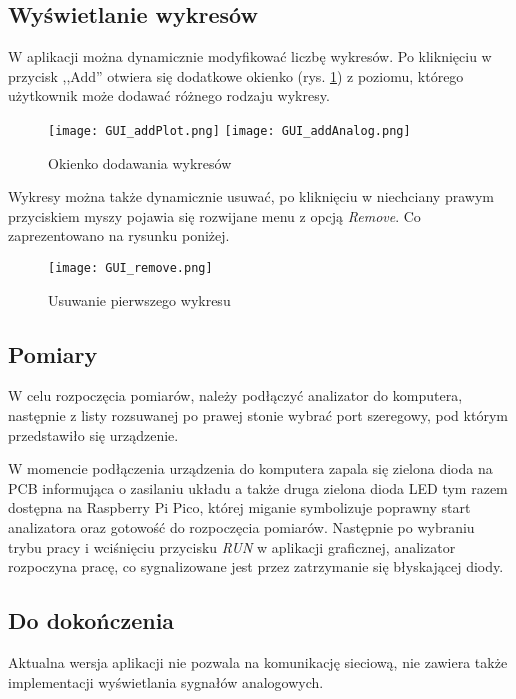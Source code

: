     \subsection{Wyświetlanie wykresów}
        W aplikacji można dynamicznie modyfikować liczbę wykresów.
        Po kliknięciu w przycisk ,,Add'' otwiera się dodatkowe okienko (rys. \ref{fig:gui_addPlot}) z poziomu,
        którego użytkownik może dodawać różnego rodzaju wykresy.
        \begin{figure}[!ht]
            \centering
            \texttt{[image: GUI\_addPlot.png]}
            \texttt{[image: GUI\_addAnalog.png]}
            \caption{Okienko dodawania wykresów}
            \label{fig:gui_addPlot}
        \end{figure}

        Wykresy można także dynamicznie usuwać, po kliknięciu w niechciany prawym przyciskiem myszy pojawia się rozwijane menu z opcją \textit{Remove}.
        Co zaprezentowano na rysunku poniżej.

        \begin{figure}[!ht]
            \centering
            \texttt{[image: GUI\_remove.png]}
            \caption{Usuwanie pierwszego wykresu}
            \label{fig:gui_removePlot}
        \end{figure}

    
    \subsection{Pomiary}
        W celu rozpoczęcia pomiarów, należy podłączyć analizator do komputera, 
        następnie z listy rozsuwanej po prawej stonie wybrać port szeregowy,
        pod którym przedstawiło się urządzenie.

        W momencie podłączenia urządzenia do komputera zapala się zielona dioda na PCB informująca o zasilaniu układu a także
        druga zielona dioda LED tym razem dostępna na Raspberry Pi Pico, której miganie symbolizuje poprawny start analizatora oraz gotowość do rozpoczęcia pomiarów.
        Następnie po wybraniu trybu pracy i wciśnięciu przycisku \textit{RUN} w aplikacji graficznej, analizator rozpoczyna pracę,
        co sygnalizowane jest przez zatrzymanie się błyskającej diody.
    
    \subsection{Do dokończenia}
        Aktualna wersja aplikacji nie pozwala na komunikację sieciową, nie zawiera także implementacji wyświetlania sygnałów analogowych.

